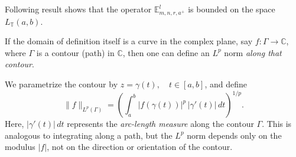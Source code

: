 \documentclass[a4paper,12pt]{article}
\theoremstyle{remark}
\begin{document}
\noindent Following result shows that the operator $\mathbb{E}_{m,n,r,a^+}^l$  is bounded on the space $L_{\mathbb{T}}(a,b).$ 

If the domain of definition itself is a curve in the complex plane, say $f : \Gamma \to \mathbb{C}$, where $\Gamma$ is a contour (path) in $\mathbb{C}$, then one can define an 
$L^p$ norm \emph{along that contour}.

We parametrize the contour by $z = \gamma(t), \quad t \in [a,b]$, and define
\[\parallel f\parallel _{L^p(\Gamma)} = 
\left( \int_a^b |f(\gamma(t))|^p \, |\gamma'(t)| \, dt \right)^{1/p}.\]
Here, $|\gamma'(t)|\,dt$ represents the \emph{arc-length measure} along the contour $\Gamma$.  
This is analogous to integrating along a path, but the $L^p$ norm depends only on the modulus $|f|$, not on the direction or orientation of the contour.
\end{document}
